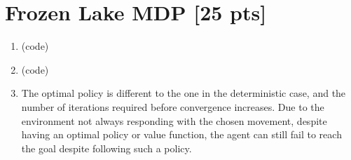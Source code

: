 \documentclass[11pt]{article}
\begin{document}
\begin{enumerate}[label=(\alph*)]
\end{enumerate}

\section{Frozen Lake MDP [25 pts]}

\begin{enumerate}[label=(\alph*)]

\item (code)
\item (code)
\item The optimal policy is different to the one in the deterministic case, and the number of iterations required before convergence increases. Due to the environment not always responding with the chosen movement, despite having an optimal policy or value function, the agent can still fail to reach the goal despite following such a policy.
	
\end{enumerate}
\end{document}

